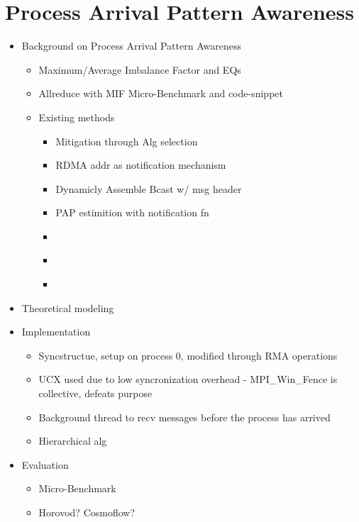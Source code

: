 
\glsresetall %
\chapter[PAPAwareness]{Process Arrival Pattern Awareness}\label{ch:PAPAwareness}

\begin{itemize}
    \item Background on Process Arrival Pattern Awareness
    \begin{itemize}
        \item Maximum/Average Imbalance Factor and EQs
        \item Allreduce with MIF Micro-Benchmark and code-snippet
        \item Existing methods
        \begin{itemize}
            \item Mitigation through Alg selection
            \item RDMA addr as notification mechanism \cite{Qian2009ProcArrivalSHMA2AIB}
            \item Dynamicly Assemble Bcast w/ msg header \cite{Patarasuk2008EffBcastDifProcArr}
            \item PAP estimition with notification fn \cite{Proficz2018ImprvAllReduceForImbPAP, Proficz2020PAPAwareScatterGather, Proficz2021AllGatherResilientToImbPAP}
            \item \cite{Parsons2015ExpProcImbMPICollHierarcialSys}
            \item \cite{Faraj2008StudyProcArrivalMPIColl}
            \item \cite{Luo2018ADAPT}
        \end{itemize}
    \end{itemize}
    \item Theoretical modeling
    \item Implementation
    \begin{itemize}
        \item Syncstructue, setup on process 0, modified through RMA operations
        \item UCX used due to low syncronization overhead - MPI\_Win\_Fence is collective, defeats purpose
        \item Background thread to recv messages before the process has arrived 
        \item Hierarchical alg 
    \end{itemize}
    \item Evaluation
    \begin{itemize}
        \item Micro-Benchmark
        \item Horovod? Cosmoflow?
    \end{itemize}
\end{itemize}

